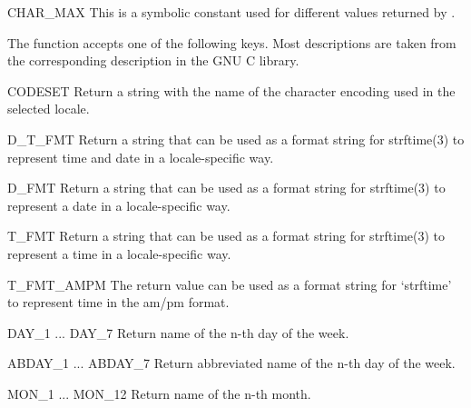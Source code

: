 \begin{datadesc}{CHAR_MAX}
  This is a symbolic constant used for different values returned by
  .
\end{datadesc}

The  function accepts one of the following keys.
Most descriptions are taken from the corresponding description in the
GNU C library.

\begin{datadesc}{CODESET}
Return a string with the name of the character encoding used in the
selected locale.
\end{datadesc}

\begin{datadesc}{D_T_FMT}
Return a string that can be used as a format string for strftime(3) to
represent time and date in a locale-specific way.
\end{datadesc}

\begin{datadesc}{D_FMT}
Return a string that can be used as a format string for strftime(3) to
represent a date in a locale-specific way.
\end{datadesc}

\begin{datadesc}{T_FMT}
Return a string that can be used as a format string for strftime(3) to
represent a time in a locale-specific way.
\end{datadesc}

\begin{datadesc}{T_FMT_AMPM}
The return value can be used as a format string for `strftime' to
represent time in the am/pm format.
\end{datadesc}

\begin{datadesc}{DAY_1 ... DAY_7}
Return name of the n-th day of the week. 
\end{datadesc}

\begin{datadesc}{ABDAY_1 ... ABDAY_7}
Return abbreviated name of the n-th day of the week.
\end{datadesc}

\begin{datadesc}{MON_1 ... MON_12}
Return name of the n-th month.
\end{datadesc}

